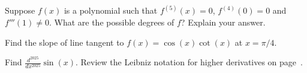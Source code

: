 \documentclass[../main.tex]{subfiles}
\begin{document}
\begin{example}
  Suppose \(f(x)\) is a polynomial such that \(f^{(5)}(x) = 0\), \(f^{(4)}(0) = 0\) and \(f'''(1) \ne 0\). What are the possible degrees of \(f\)? Explain your answer.

\end{example}
\clearpage

\begin{example}
  Find the slope of line tangent to \(f(x) = \cos(x)\cot(x)\) at \(x = \pi/4\).

\end{example}

\begin{example}
  Find \(\frac{d^{2025}}{dx^{2025}} \sin(x)\). Review the Leibniz notation for higher derivatives on page~\pageref{page:higher-derivatives}.

\end{example}
\end{document}
